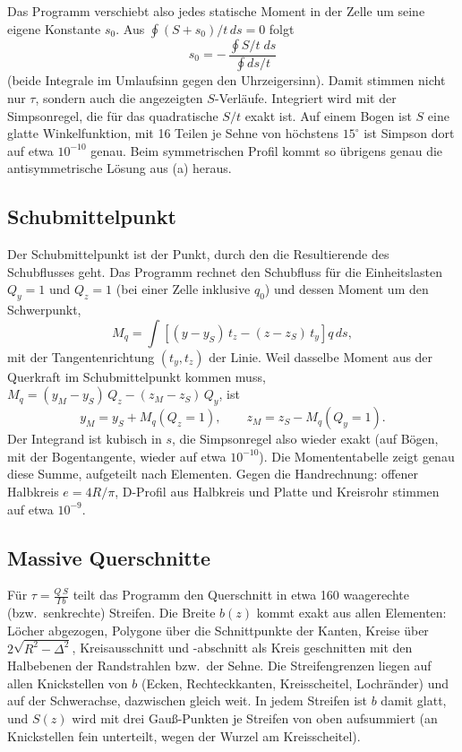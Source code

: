 Das Programm verschiebt also jedes statische Moment in der Zelle um seine eigene Konstante $s_0$.
Aus $\oint (S + s_0)/t\,ds = 0$ folgt
\[
  s_0 = -\,\frac{\oint S/t\;ds}{\oint ds/t}
\]
(beide Integrale im Umlaufsinn gegen den Uhrzeigersinn). Damit stimmen nicht nur $\tau$, sondern
auch die angezeigten $S$-Verläufe. Integriert wird mit der Simpsonregel, die für das quadratische
$S/t$ exakt ist. Auf einem Bogen ist $S$ eine glatte Winkelfunktion, mit 16 Teilen je Sehne
von höchstens $15^\circ$ ist Simpson dort auf etwa $10^{-10}$ genau. Beim symmetrischen Profil kommt
so übrigens genau die antisymmetrische Lösung aus (a) heraus.

\subsection{Schubmittelpunkt}

Der Schubmittelpunkt ist der Punkt, durch den die Resultierende des Schubflusses geht. Das
Programm rechnet den Schubfluss für die Einheitslasten $Q_y = 1$ und $Q_z = 1$ (bei einer Zelle
inklusive $q_0$) und dessen Moment um den Schwerpunkt,
\[
  M_q = \int \left[(y - y_S)\,t_z - (z - z_S)\,t_y\right] q\,ds ,
\]
mit der Tangentenrichtung $(t_y, t_z)$ der Linie. Weil dasselbe Moment aus der Querkraft im
Schubmittelpunkt kommen muss, $M_q = (y_M - y_S)\,Q_z - (z_M - z_S)\,Q_y$, ist
\[
  y_M = y_S + M_q(Q_z = 1), \qquad z_M = z_S - M_q(Q_y = 1) .
\]
Der Integrand ist kubisch in $s$, die Simpsonregel also wieder exakt (auf Bögen, mit der
Bogentangente, wieder auf etwa $10^{-10}$). Die Momententabelle zeigt genau diese Summe, aufgeteilt
nach Elementen. Gegen die Handrechnung: offener Halbkreis $e = 4R/\pi$, D-Profil aus Halbkreis und
Platte und Kreisrohr stimmen auf etwa $10^{-9}$.

\subsection{Massive Querschnitte}

Für $\tau = \frac{Q\,S}{I\,b}$ teilt das Programm den Querschnitt in etwa 160 waagerechte (bzw.\
senkrechte) Streifen. Die Breite $b(z)$ kommt exakt aus allen Elementen: Löcher abgezogen, Polygone
über die Schnittpunkte der Kanten, Kreise über $2\sqrt{R^2 - \Delta^2}$, Kreisausschnitt und
-abschnitt als Kreis geschnitten mit den Halbebenen der Randstrahlen bzw.\ der Sehne. Die
Streifengrenzen liegen auf allen Knickstellen von $b$ (Ecken, Rechteckkanten, Kreisscheitel,
Lochränder) und auf der Schwerachse, dazwischen gleich weit. In jedem Streifen ist $b$ damit glatt,
und $S(z)$ wird mit drei Gauß-Punkten je Streifen von oben aufsummiert (an Knickstellen fein
unterteilt, wegen der Wurzel am Kreisscheitel).

